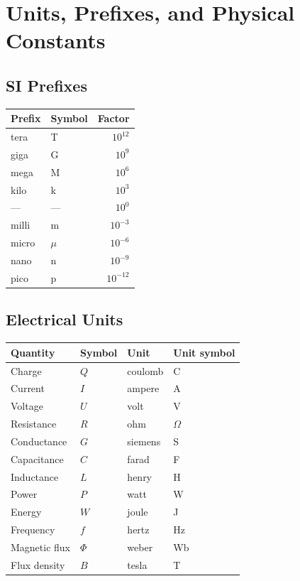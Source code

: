 \chapter{Units, Prefixes, and Physical Constants}
\label{app:units}

\section*{SI Prefixes}
\begin{center}
\renewcommand{\arraystretch}{1.15}
\begin{tabular}{@{}llr@{}}
\toprule
Prefix & Symbol & Factor \\
\midrule
tera & T & $10^{12}$ \\
giga & G & $10^{9}$ \\
mega & M & $10^{6}$ \\
kilo & k & $10^{3}$ \\
--- & --- & $10^{0}$ \\
milli & m & $10^{-3}$ \\
micro & $\mu$ & $10^{-6}$ \\
nano & n & $10^{-9}$ \\
pico & p & $10^{-12}$ \\
\bottomrule
\end{tabular}
\end{center}

\section*{Electrical Units}
\begin{center}
\renewcommand{\arraystretch}{1.15}
\begin{tabular}{@{}llll@{}}
\toprule
Quantity & Symbol & Unit & Unit symbol \\
\midrule
Charge & $Q$ & coulomb & C \\
Current & $I$ & ampere & A \\
Voltage & $U$ & volt & V \\
Resistance & $R$ & ohm & $\Omega$ \\
Conductance & $G$ & siemens & S \\
Capacitance & $C$ & farad & F \\
Inductance & $L$ & henry & H \\
Power & $P$ & watt & W \\
Energy & $W$ & joule & J \\
Frequency & $f$ & hertz & Hz \\
Magnetic flux & $\Phi$ & weber & Wb \\
Flux density & $B$ & tesla & T \\
\bottomrule
\end{tabular}
\end{center}

